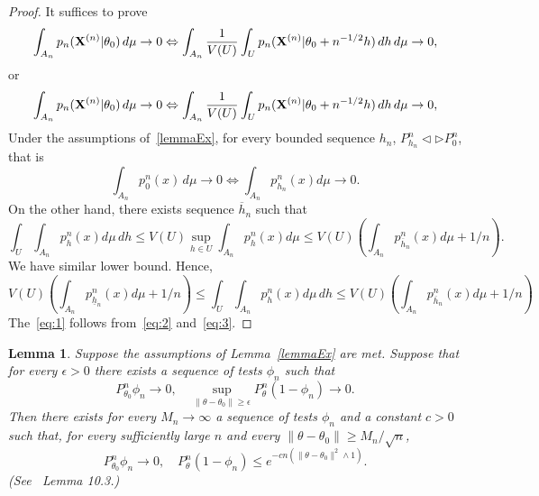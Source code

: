 \documentclass[3p]{elsarticle}
\theoremstyle{plain}
\newtheorem{lemma}{\quad\quad Lemma}
\theoremstyle{definition}
\theoremstyle{remark}
\begin{document}
\begin{proof}
    It suffices to prove
\begin{equation*}
    \int_{A_n}p_n(\mathbf{X}^{(n)}|\theta_0)\, d\mu \to 0 \Leftrightarrow \int_{A_n}\frac{1}{V(U)}\int_U p_n(\mathbf{X}^{(n)}|\theta_0+n^{-1/2}h)\, dh \, d\mu \to 0,
\end{equation*}
or
\begin{equation}\label{eq:1}
    \int_{A_n}p_n(\mathbf{X}^{(n)}|\theta_0)\, d\mu \to 0 \Leftrightarrow \int_{A_n}\frac{1}{V(U)}\int_U p_n(\mathbf{X}^{(n)}|\theta_0+n^{-1/2}h)\, dh \, d\mu \to 0,
\end{equation}
Under the assumptions of~\ref{lemmaEx}, for every bounded sequence $h_n$, $P_{h_n}^n\triangleleft \triangleright P_{0}^n$, that is
\begin{equation}\label{eq:2}
\int_{A_n}p_0^n(x)\, d\mu \to 0 \Leftrightarrow \int_{A_n} p_{h_n}^n(x) d\mu  \to 0.
\end{equation}
On the other hand, there exists sequence $\overline{h}_n$ such that
\begin{equation}
\int_{U}\int_{A_n} p_h^n(x) d\mu \, dh
\leq V(U)\sup_{h\in U}\int_{A_n} p_h^n(x) d\mu
\leq V(U)(\int_{A_n}p^n_{\overline{h}_n}(x)d\mu +1/n).
\end{equation}
 We have similar lower bound. Hence,
\begin{equation}\label{eq:3}
 V(U)(\int_{A_n}p^n_{\underline{h}_n}(x)d\mu +1/n)
\leq \int_{U}\int_{A_n} p_h^n(x) d\mu \, dh
\leq V(U)(\int_{A_n}p^n_{\overline{h}_n}(x)d\mu +1/n)
\end{equation}
The~\eqref{eq:1} follows from~\eqref{eq:2} and~\eqref{eq:3}.
\end{proof}

\begin{lemma}\label{lemmaTest}
    Suppose the assumptions of Lemma~\ref{lemmaEx} are met. Suppose that for every $\epsilon>0$ there exists a sequence of tests $\phi_n$ such that
$$
P_{\theta_0}^n \phi_n \to 0,\quad \sup_{\|\theta-\theta_0\|\geq \epsilon}P_{\theta}^n (1-\phi_n)\to 0.
$$
Then there exists for every $M_n\to \infty$ a sequence of tests $\phi_n$ and a constant $c>0$ such that, for every sufficiently large $n$ and every $\|\theta-\theta_0\|\geq M_n /\sqrt{n}$,
$$
P_{\theta_0}^n\phi_n \to 0, \quad P_\theta^n (1-\phi_n)\leq e^{-cn(\|\theta-\theta_0\|^2\wedge 1)}.
$$
    (See~\cite{van2000asymptotic} Lemma 10.3.)
\end{lemma}
\end{document}
